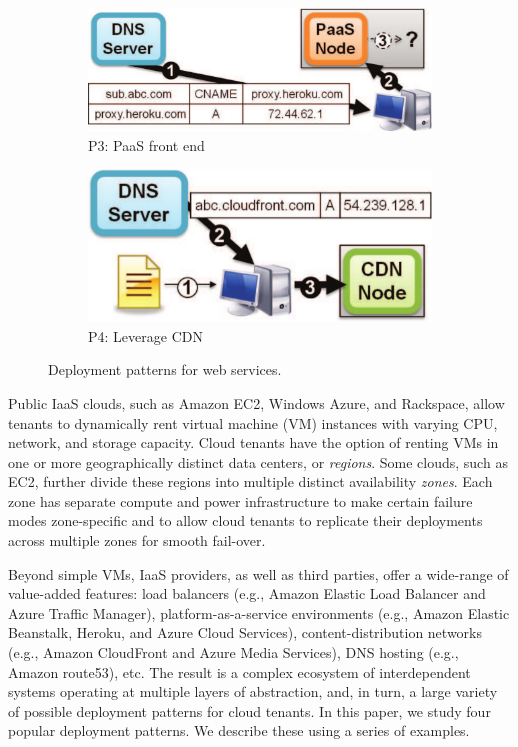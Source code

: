 \begin{figure}[t]
\begin{subfigure}[b]{0.20\textwidth}
    \includegraphics[width=\textwidth]{figures/cloudmeasure/imag_sec2/ec2_heroku.pdf}
    \caption{P3: PaaS front end}
    \label{fig:ec2_paas}
\end{subfigure}
\hspace{0.03\columnwidth}
\begin{subfigure}[b]{0.30\textwidth}
    \includegraphics[width=\textwidth]{figures/cloudmeasure/imag_sec2/ec2_cdn.pdf}
    \caption{P4: Leverage CDN}
    \label{fig:ec2_cdn}
\end{subfigure}

\caption{Deployment patterns for web services.}
\label{fig:ec2_models}

\end{figure}


Public IaaS clouds, such as Amazon EC2, Windows Azure, and Rackspace,
allow tenants to dynamically rent virtual machine (VM) instances with
varying CPU, network, and storage capacity. Cloud tenants have the
option of renting VMs in one or more geographically distinct
data centers, or {\em regions}. Some clouds, such as EC2,
further divide these regions into multiple distinct availability {\em
  zones}. Each zone has separate compute and power
infrastructure to make certain failure modes zone-specific and to
allow cloud tenants to replicate their deployments across
multiple zones for smooth fail-over.

Beyond simple VMs, IaaS providers, as well as third parties, offer a
wide-range of value-added features: load balancers (e.g., Amazon
Elastic Load Balancer and Azure Traffic Manager),
plat\-form-as-a-service environments (e.g., Amazon Elastic
Beanstalk, Heroku, and Azure Cloud Services), content-distribution networks
(e.g., Amazon CloudFront and Azure Media Services), DNS hosting (e.g.,
Amazon route53), etc. The result is a complex ecosystem of
interdependent systems operating at multiple layers of abstraction,
and, in turn, a large variety of possible deployment patterns for
cloud tenants. In this paper, we study four popular deployment patterns. We
describe these using a series of examples.

